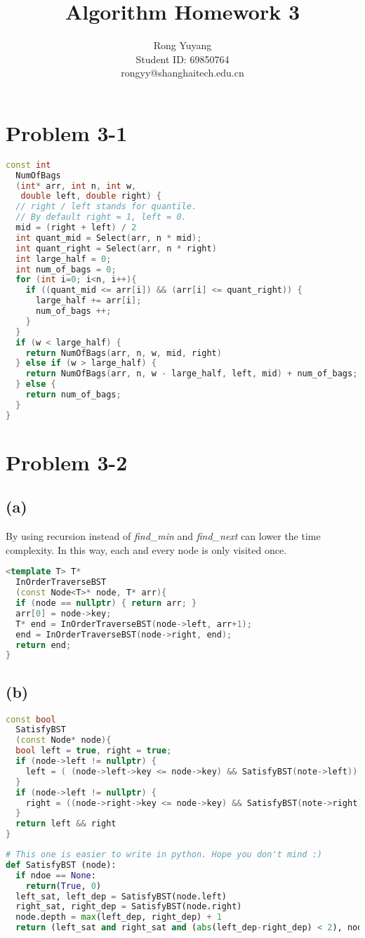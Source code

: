 \documentclass{article}
\title{Algorithm Homework 3}
\author{Rong Yuyang \\ Student ID: 69850764 \\ rongyy@shanghaitech.edu.cn}
\begin{document}
\maketitle

\section*{Problem 3-1}
\begin{lstlisting}[language = C++]
const int 
  NumOfBags
  (int* arr, int n, int w, 
   double left, double right) {
  // right / left stands for quantile.
  // By default right = 1, left = 0.
  mid = (right + left) / 2
  int quant_mid = Select(arr, n * mid);
  int quant_right = Select(arr, n * right)
  int large_half = 0;
  int num_of_bags = 0;
  for (int i=0; i<n, i++){
    if ((quant_mid <= arr[i]) && (arr[i] <= quant_right)) {
      large_half += arr[i];
      num_of_bags ++;
    }
  }
  if (w < large_half) {
    return NumOfBags(arr, n, w, mid, right)
  } else if (w > large_half) {
    return NumOfBags(arr, n, w - large_half, left, mid) + num_of_bags;
  } else {
    return num_of_bags;
  }
}
\end{lstlisting}  
\section*{Problem 3-2}
  \subsection*{(a)}
  By using recursion instead of \textit{find\_min} and \textit{find\_next} can lower the time complexity. In this way, each and every node is only visited once.
\begin{lstlisting}[language = C++]
<template T> T*
  InOrderTraverseBST
  (const Node<T>* node, T* arr){
  if (node == nullptr) { return arr; }
  arr[0] = node->key;
  T* end = InOrderTraverseBST(node->left, arr+1);
  end = InOrderTraverseBST(node->right, end);
  return end;
}
\end{lstlisting}   

  \subsection*{(b)}
\begin{lstlisting}[language = C++]
const bool
  SatisfyBST 
  (const Node* node){
  bool left = true, right = true;
  if (node->left != nullptr) {
    left = ( (node->left->key <= node->key) && SatisfyBST(note->left))
  } 
  if (node->left != nullptr) {
    right = ((node->right->key <= node->key) && SatisfyBST(note->right))
  } 
  return left && right
}
\end{lstlisting}   
\begin{lstlisting}[language = python]
# This one is easier to write in python. Hope you don't mind :)
def SatisfyBST (node):
  if ndoe == None:
    return(True, 0)
  left_sat, left_dep = SatisfyBST(node.left)
  right_sat, right_dep = SatisfyBST(node.right)
  node.depth = max(left_dep, right_dep) + 1
  return (left_sat and right_sat and (abs(left_dep-right_dep) < 2), node.depth)

\end{lstlisting}   
  
\end{document}
